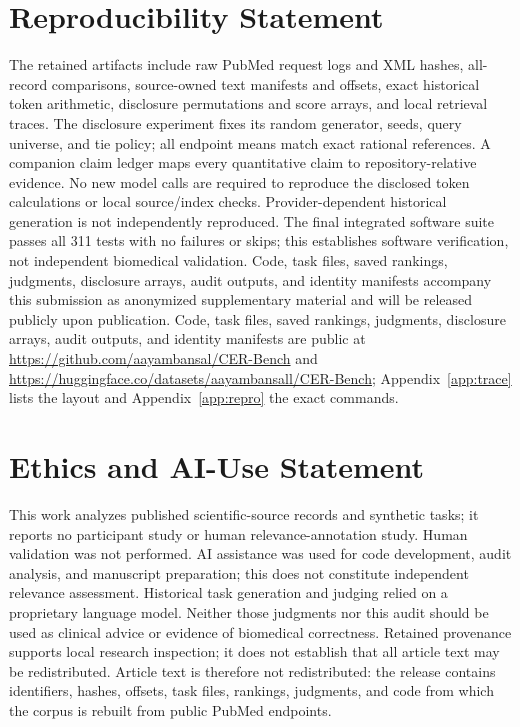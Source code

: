 \section*{Reproducibility Statement}
The retained artifacts include raw PubMed request logs and XML hashes, all-record comparisons, source-owned text manifests and offsets, exact historical token arithmetic, disclosure permutations and score arrays, and local retrieval traces. The disclosure experiment fixes its random generator, seeds, query universe, and tie policy; all endpoint means match exact rational references. A companion claim ledger maps every quantitative claim to repository-relative evidence. No new model calls are required to reproduce the disclosed token calculations or local source/index checks. Provider-dependent historical generation is not independently reproduced. The final integrated software suite passes all 311 tests with no failures or skips; this establishes software verification, not independent biomedical validation. \ifanon Code, task files, saved rankings, judgments, disclosure arrays, audit outputs, and identity manifests accompany this submission as anonymized supplementary material and will be released publicly upon publication. \else Code, task files, saved rankings, judgments, disclosure arrays, audit outputs, and identity manifests are public at \url{https://github.com/aayambansal/CER-Bench} and \url{https://huggingface.co/datasets/aayambansall/CER-Bench}; Appendix~\ref{app:trace} lists the layout and Appendix~\ref{app:repro} the exact commands. \fi

\section*{Ethics and AI-Use Statement}
This work analyzes published scientific-source records and synthetic tasks; it reports no participant study or human relevance-annotation study. Human validation was not performed. AI assistance was used for code development, audit analysis, and manuscript preparation; this does not constitute independent relevance assessment. Historical task generation and judging relied on a proprietary language model. Neither those judgments nor this audit should be used as clinical advice or evidence of biomedical correctness. Retained provenance supports local research inspection; it does not establish that all article text may be redistributed. Article text is therefore not redistributed: the release contains identifiers, hashes, offsets, task files, rankings, judgments, and code from which the corpus is rebuilt from public PubMed endpoints.

